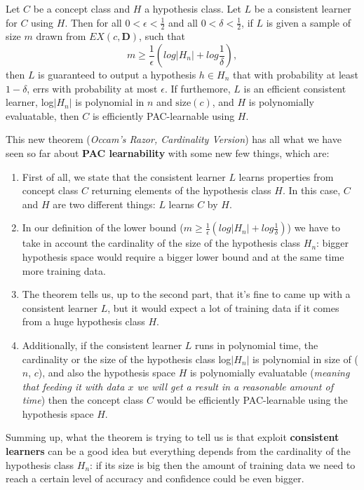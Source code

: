 \begin{definition}[title = {Theorem (Occam's Razor, Cardinality Version)}]
    Let $C$ be a concept class and $H$ a hypothesis class. Let $L$ be a consistent learner for $C$ using $H$. Then for all $0 < \epsilon < \frac{1}{2}$
    and all $0 < \delta < \frac{1}{2}$, if $L$ is given a sample of size $m$ drawn from $EX(c, \boldsymbol{D})$, such that
    $$m \geq \frac{1}{\epsilon}(log|H_n|+log \frac{1}{\delta}),$$
    then $L$ is guaranteed to output a hypothesis $h \in H_n$ that with probability at least $1 - \delta$, errs with probability at most $\epsilon$. If
    furthemore, $L$ is an efficient consistent learner, log$|H_n|$ is polynomial in $n$ and $\text{size}(c)$, and $H$ is polynomially evaluatable, then $C$
    is efficiently PAC-learnable using $H$.
\end{definition}
This new theorem (\textit{Occam's Razor, Cardinality Version}) has all what we have seen so far about \textbf{PAC learnability} with some new few things, which are:
\begin{enumerate}
    \item First of all, we state that the consistent learner $L$ learns properties from concept class $C$ returning elements of the hypothesis class $H$. In this case, $C$ and $H$ are two different things: $L$ learns $C$ by $H$.
    \item In our definition of the lower bound ($m \geq \frac{1}{\epsilon}(log|H_n|+log \frac{1}{\delta})$) we have to take in account the cardinality of the size of the hypothesis class $H_n$: bigger hypothesis space would require a bigger lower bound and at the same time more training data.
    \item The theorem tells us, up to the second part, that it's fine to came up with a consistent learner $L$, but it would expect a lot of training data if it comes from a huge hypothesis class $H$.
    \item Additionally, if the consistent learner $L$ runs in polynomial time, the cardinality or the size of the hypothesis class log$|H_n|$ is polynomial in size of ($n$, $c$), and also the hypothesis space $H$ is polynomially evaluatable (\textit{meaning that feeding it with data $x$ we will get a result in a reasonable amount of time}) then the concept class $C$ would be efficiently PAC-learnable using the hypothesis space $H$.
\end{enumerate}
Summing up, what the theorem is trying to tell us is that exploit \textbf{consistent learners} can be a good idea but everything depends from the cardinality of the hypothesis class $H_n$: if its size 
is big then the amount of training data we need to reach a certain level of accuracy and confidence could be even bigger.